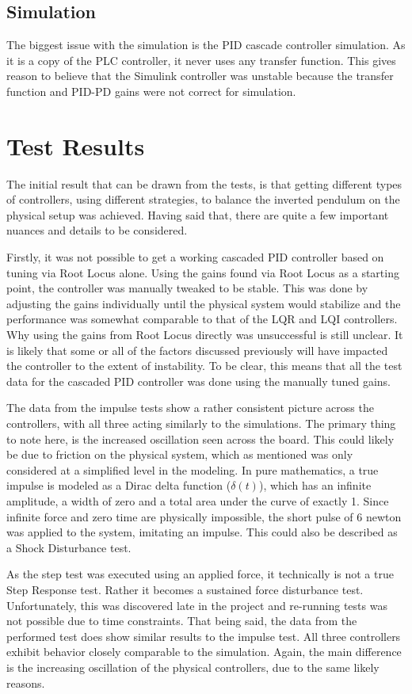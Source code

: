 \subsection{Simulation}
The biggest issue with the simulation is the PID cascade controller simulation. As it is a copy of the PLC controller, it never uses any transfer function. This gives reason to believe that the Simulink controller was unstable because the transfer function and PID-PD gains were not correct for simulation.

\section{Test Results}
The initial result that can be drawn from the tests, is that getting different types of controllers, using different strategies, to balance the inverted pendulum on the physical setup was achieved. Having said that, there are quite a few important nuances and details to be considered.

Firstly, it was not possible to get a working cascaded PID controller based on tuning via Root Locus alone. Using the gains found via Root Locus as a starting point, the controller was manually tweaked to be stable. This was done by adjusting the gains individually until the physical system would stabilize and the performance was somewhat comparable to that of the LQR and LQI controllers. Why using the gains from Root Locus directly was unsuccessful is still unclear. It is likely that some or all of the factors discussed previously will have impacted the controller to the extent of instability. To be clear, this means that all the test data for the cascaded PID controller was done using the manually tuned gains. 

The data from the impulse tests show a rather consistent picture across the controllers, with all three acting similarly to the simulations. The primary thing to note here, is the increased oscillation seen across the board. This could likely be due to friction on the physical system, which as mentioned was only considered at a simplified level in the modeling. In pure mathematics, a true impulse is modeled as a Dirac delta function ($\delta(t)$), which has an infinite amplitude, a width of zero and a total area under the curve of exactly 1. Since infinite force and zero time are physically impossible, the short pulse of 6 newton was applied to the system, imitating an impulse. This could also be described as a Shock Disturbance test.

As the step test was executed using an applied force, it technically is not a true Step Response test. Rather it becomes a sustained force disturbance test. Unfortunately, this was discovered late in the project and re-running tests was not possible due to time constraints. That being said, the data from the performed test does show similar results to the impulse test. All three controllers exhibit behavior closely comparable to the simulation. Again, the main difference is the increasing oscillation of the physical controllers, due to the same likely reasons.

